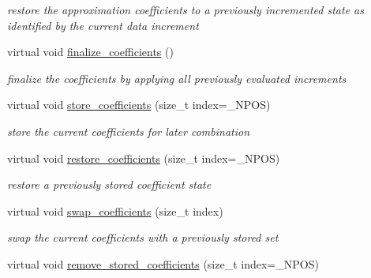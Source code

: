 \begin{DoxyCompactItemize}
\begin{DoxyCompactList}\small\item\em restore the approximation coefficients to a previously incremented state as identified by the current data increment \end{DoxyCompactList}\item 
virtual void \hyperlink{classPecos_1_1BasisApproximation_a742e0217d6f681e08f401409771f4f4a}{finalize\+\_\+coefficients} ()\label{classPecos_1_1BasisApproximation_a742e0217d6f681e08f401409771f4f4a}

\begin{DoxyCompactList}\small\item\em finalize the coefficients by applying all previously evaluated increments \end{DoxyCompactList}\item 
virtual void \hyperlink{classPecos_1_1BasisApproximation_abc17a7104c33d8146f4a0ee7b6c6f37a}{store\+\_\+coefficients} (size\+\_\+t index=\+\_\+\+N\+P\+OS)\label{classPecos_1_1BasisApproximation_abc17a7104c33d8146f4a0ee7b6c6f37a}

\begin{DoxyCompactList}\small\item\em store the current coefficients for later combination \end{DoxyCompactList}\item 
virtual void \hyperlink{classPecos_1_1BasisApproximation_ad05b093ee96314c9e05bad8e06c2dae7}{restore\+\_\+coefficients} (size\+\_\+t index=\+\_\+\+N\+P\+OS)\label{classPecos_1_1BasisApproximation_ad05b093ee96314c9e05bad8e06c2dae7}

\begin{DoxyCompactList}\small\item\em restore a previously stored coefficient state \end{DoxyCompactList}\item 
virtual void \hyperlink{classPecos_1_1BasisApproximation_af5c6af74d2c8c5575fefb46ce55af90d}{swap\+\_\+coefficients} (size\+\_\+t index)\label{classPecos_1_1BasisApproximation_af5c6af74d2c8c5575fefb46ce55af90d}

\begin{DoxyCompactList}\small\item\em swap the current coefficients with a previously stored set \end{DoxyCompactList}\item 
virtual void \hyperlink{classPecos_1_1BasisApproximation_a63d12cc6021fda4896b8738d72dfcc86}{remove\+\_\+stored\+\_\+coefficients} (size\+\_\+t index=\+\_\+\+N\+P\+OS)\label{classPecos_1_1BasisApproximation_a63d12cc6021fda4896b8738d72dfcc86}


\end{DoxyCompactItemize}
